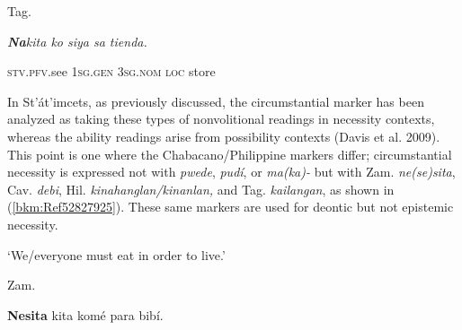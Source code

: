 \begin{listWWNumiileveli}
\item 
\begin{listWWNumiilevelii}
\item 
\begin{stylelsLanginfo}
Tag.
\end{stylelsLanginfo}
\end{listWWNumiilevelii}
\end{listWWNumiileveli}
\begin{stylelsLanginfo}
\textbf{\textit{Na}}\textit{kita ko siya sa tienda.}
\end{stylelsLanginfo}

\begin{stylelsIMT}
\textsc{stv.pfv.}see\textsc{ }1\textsc{sg.gen }3\textsc{sg.nom loc }store
\end{stylelsIMT}

\begin{styleStandard}
In St’át’imcets, as previously discussed, the circumstantial marker has been analyzed as taking these types of nonvolitional readings in necessity contexts, whereas the ability readings arise from possibility contexts (Davis et al. 2009). This point is one where the Chabacano/Philippine markers differ; circumstantial necessity is expressed not with \textit{pwede}, \textit{pudí}, or \textit{ma(ka)- }but with Zam. \textit{ne(se)sita}, Cav. \textit{debi}, Hil. \textit{kinahanglan/kinanlan,} and Tag. \textit{kailangan}, as shown in (\ref{bkm:Ref52827925}). These same markers are used for deontic but not epistemic necessity.
\end{styleStandard}

\begin{listWWNumiileveli}
\item 
\begin{stylelsLanginfo}
\label{bkm:Ref52827925}‘We/everyone must eat in order to live.’
\end{stylelsLanginfo}

\begin{listWWNumiilevelii}
\item 
\begin{stylelsLanginfo}
Zam.
\end{stylelsLanginfo}
\end{listWWNumiilevelii}
\end{listWWNumiileveli}
\begin{stylelsSourceline}
\textbf{Nesita} kita komé para bibí.
\end{stylelsSourceline}

